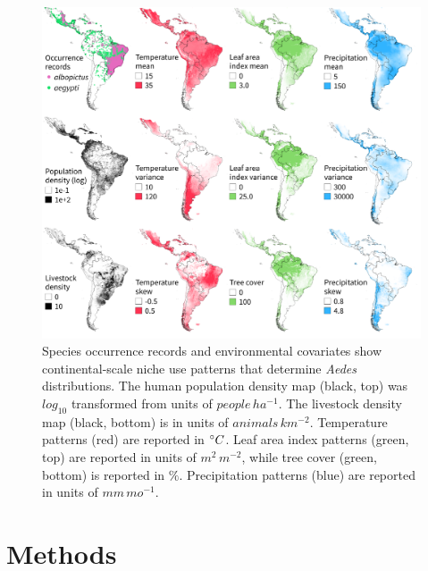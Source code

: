 \begin{figure}[!ht]
\includegraphics[width=\textwidth]{figures/ch3-map-covariates.pdf}
\centering
\caption[Species occurrence records and environmental covariates show continental-scale niche use patterns that determine \textit{Aedes} distributions.]{Species occurrence records and environmental covariates show continental-scale niche use patterns that determine \textit{Aedes} distributions. The human population density map (black, top) was $log_10$ transformed from units of $people\, ha^{-1}$. The livestock density map (black, bottom) is in units of $animals\, km^{-2}$. Temperature patterns (red) are reported in $\degree C$. Leaf area index patterns (green, top) are reported in units of $m^2\, m^{-2}$, while tree cover (green, bottom) is reported in $\%$. Precipitation patterns (blue) are reported in units of $mm\, mo^{-1}$.}
\label{fig:map-covariates}
\end{figure}

\section{Methods}

